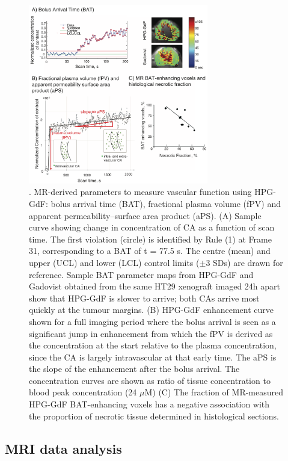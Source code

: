 \begin{figure}[htbp]   
 \begin{center}  
 \includegraphics[width=0.7\textwidth]{hpg/hpg-images/hpg_fig2-bat.png}
 \caption{. MR-derived parameters to measure vascular function using HPG-GdF: bolus arrival time (BAT), fractional plasma volume (fPV) and apparent permeability–surface area product (aPS). (A) Sample curve showing change in concentration of CA as a function of scan time. The first violation (circle) is identified by Rule (1) at Frame 31, corresponding to a BAT of t = 77.5 s. The centre (mean) and upper (UCL) and lower (LCL) control limits ($\pm$3 SDs) are drawn for reference. Sample BAT parameter maps from HPG-GdF and Gadovist obtained from the same HT29 xenograft imaged 24h apart show that HPG-GdF is slower to arrive; both CAs arrive most quickly at the tumour margins. (B) HPG-GdF enhancement curve shown for a full imaging period where the bolus arrival is seen as a significant jump in enhancement from which the fPV is derived as the concentration at the start relative to the plasma concentration, since the CA is largely intravascular at that early time. The aPS is the slope of the enhancement after the bolus arrival. The concentration curves are shown as ratio of tissue concentration to blood peak concentration (24 $\mu$M) (C) The fraction of MR-measured HPG-GdF BAT-enhancing voxels has a negative association with the proportion of necrotic tissue determined in histological sections.}  
 \label{hpgpaper:fig2}  
 \end{center}
\end{figure}

\subsection{MRI data analysis}


